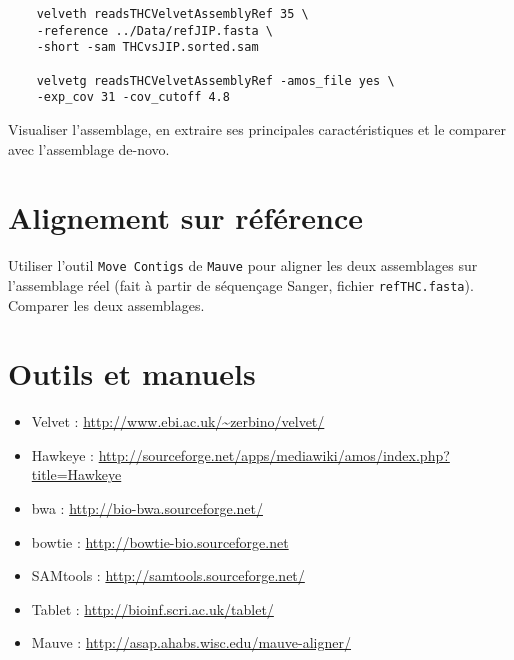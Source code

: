 \documentclass[a4paper,12pt]{article}
\begin{document}
\begin{lstlisting}
	velveth readsTHCVelvetAssemblyRef 35 \
	-reference ../Data/refJIP.fasta \
	-short -sam THCvsJIP.sorted.sam 
	
	velvetg readsTHCVelvetAssemblyRef -amos_file yes \
	-exp_cov 31 -cov_cutoff 4.8
\end{lstlisting}

Visualiser l'assemblage, en extraire ses principales caractéristiques et le comparer avec l'assemblage de-novo.

\section{Alignement sur référence}
Utiliser l'outil \verb=Move Contigs= de \verb=Mauve= pour aligner les deux assemblages sur l'assemblage réel (fait à partir de séquençage Sanger, fichier \verb=refTHC.fasta=). Comparer les deux assemblages. 

\section{Outils et manuels}

\begin{itemize}
	\item Velvet : \url{http://www.ebi.ac.uk/~zerbino/velvet/}
	\item Hawkeye : \url{http://sourceforge.net/apps/mediawiki/amos/index.php?title=Hawkeye}
	\item bwa : \url{http://bio-bwa.sourceforge.net/}
	\item bowtie : \url{http://bowtie-bio.sourceforge.net}
	\item SAMtools : \url{http://samtools.sourceforge.net/}
	\item Tablet : \url{http://bioinf.scri.ac.uk/tablet/}
	\item Mauve : \url{http://asap.ahabs.wisc.edu/mauve-aligner/}
	
\end{itemize}

{}

\end{document}
